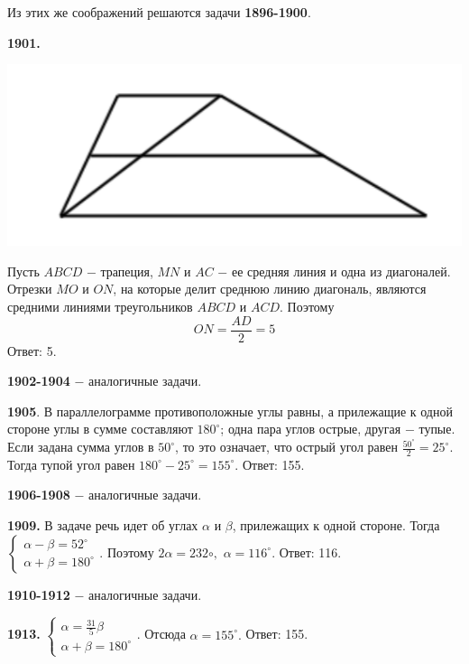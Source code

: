 Из этих же соображений решаются задачи \textbf{1896-1900}.

\textbf{1901.}

{\centering \includegraphics[width=0.5\linewidth]{Geometry/Content/25.png}
	
}

Пусть $ABCD$ $-$ трапеция, $MN$ и $AC$ $-$ ее средняя линия и одна из диагоналей. Отрезки $MO$ и $ON$, на которые делит среднюю линию диагональ, являются средними линиями треугольников $ABCD$ и $ACD$. Поэтому
\[
ON = \frac{AD}{2} = 5
\] \null \hspace*{\fill} Ответ: 5.

\textbf{1902-1904} $-$ аналогичные задачи.

\textbf{1905}. В параллелограмме противоположные углы равны, а прилежащие к одной стороне углы в сумме составляют $180^\circ$; одна пара углов острые, другая $-$ тупые. Если задана сумма углов в $50^\circ$, то это означает, что острый угол равен $\frac{50^\circ}{2} = 25^\circ$. Тогда тупой угол равен $180^\circ - 25^\circ = 155^\circ.$ \newline \null \hspace*{\fill} Ответ: 155.

\textbf{1906-1908} $-$ аналогичные задачи.

\clearpage

\textbf{1909.} В задаче речь идет об углах $\alpha$ и $\beta$, прилежащих к одной стороне. Тогда   $\begin{cases} \alpha - \beta = 52^\circ \\ \alpha + \beta = 180^\circ \end{cases}$. Поэтому $2\alpha = 232\circ,$ $\alpha = 116^\circ.$ \newline \null \hspace*{\fill} Ответ: 116.

\textbf{1910-1912} $-$ аналогичные задачи.

\textbf{1913.} $\begin{cases} \alpha = \frac{31}{5}\beta \\ \alpha + \beta = 180^\circ \end{cases}$. Отсюда $\alpha = 155^\circ.$ \newline \null \hspace*{\fill} Ответ: 155.

